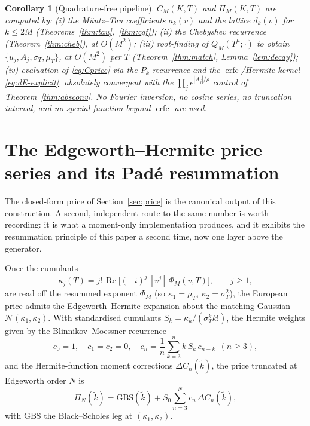 \documentclass[11pt]{article}
\newtheorem{corollary}[theorem]{Corollary}
\DeclareMathOperator{\Real}{Re}
\DeclareMathOperator{\erfc}{erfc}
\begin{document}
\begin{corollary}[Quadrature-free pipeline]\label{cor:pipeline}
$C_M(K,T)$ and $\Pi_M(K,T)$ are computed by:
\textup{(i)} the M\"untz--Tau coefficients $a_k(v)$ and the lattice $d_k(v)$
for $k\le 2M$ (Theorems~\ref{thm:tau},~\ref{thm:cgf});
\textup{(ii)} the Chebyshev recurrence (Theorem~\ref{thm:cheb}), at $O(M^2)$;
\textup{(iii)} root-finding of $Q_M(T^{\mu};\cdot)$ to obtain
$\{u_j,A_j,\sigma_T,\mu_T\}$, at $O(M^2)$ per $T$ (Theorem~\ref{thm:match},
Lemma~\ref{lem:decay});
\textup{(iv)} evaluation of \eqref{eq:Cprice} via the $P_k$ recurrence and
the $\erfc$/Hermite kernel \eqref{eq:dE-explicit}, absolutely convergent with
the $\prod_je^{|A_j|/\rho}$ control of Theorem~\ref{thm:absconv}.
No Fourier inversion, no cosine series, no truncation interval, and no
special function beyond $\erfc$ are used.
\end{corollary}

\section{The Edgeworth--Hermite price series and its Pad\'e resummation}
\label{sec:edgeworth}

The closed-form price of Section~\ref{sec:price} is the canonical output of this
construction. A second, independent route to the same number is worth recording:
it is what a moment-only implementation produces, and it exhibits the resummation
principle of this paper a second time, now one layer above the generator.

Once the cumulants
\begin{equation}\label{eq:cumulants-ed}
\kappa_j(T)=j!\,\Real\!\bigl[(-i)^j\,[v^j]\,\Phi_M(v,T)\bigr],\qquad j\ge1,
\end{equation}
are read off the resummed exponent $\Phi_M$ (so $\kappa_1=\mu_T$,
$\kappa_2=\sigma_T^2$), the European price admits the Edgeworth--Hermite expansion
about the matching Gaussian $\mathcal N(\kappa_1,\kappa_2)$. With standardised
cumulants $S_k=\kappa_k/(\sigma_T^k k!)$, the Hermite weights given by the
Blinnikov--Moessner recurrence~\cite{BlinnikovMoessner}
\begin{equation}\label{eq:BM}
c_0=1,\quad c_1=c_2=0,\quad
c_n=\frac1n\sum_{k=3}^{n}k\,S_k\,c_{n-k}\ \ (n\ge3),
\end{equation}
and the Hermite-function moment corrections $\Delta C_n(\tilde k)$, the price
truncated at Edgeworth order $N$ is
\begin{equation}\label{eq:edgeworth-partial}
\Pi_N(\tilde k)=\mathrm{GBS}(\tilde k)
+S_0\sum_{n=3}^{N}c_n\,\Delta C_n(\tilde k),
\end{equation}
with $\mathrm{GBS}$ the Black--Scholes leg at $(\kappa_1,\kappa_2)$.
\end{document}
